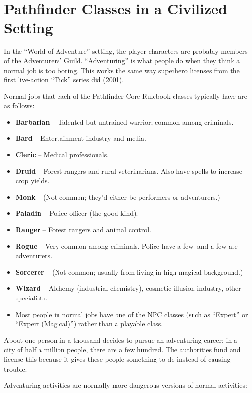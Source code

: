 %
%
\section{Pathfinder Classes in a Civilized Setting}
\label{sect-chargen-jobs}

In the ``World of Adventure'' setting, the player characters are probably
members of the Adventurers' Guild. ``Adventuring'' is what people do when
they think a normal job is too boring. This works the same way superhero
licenses from the first live-action ``Tick'' series did (2001).

Normal jobs that each of the Pathfinder Core Rulebook classes typically
have are as follows:

\begin{itemize}
%
\item \textbf{Barbarian} -- Talented but untrained warrior; common among
criminals.
%
\item \textbf{Bard} -- Entertainment industry and media.
%
\item \textbf{Cleric} -- Medical professionals.
%
\item \textbf{Druid} -- Forest rangers and rural veterinarians. Also have
spells to increase crop yields.
%
\item \textbf{Monk} -- (Not common; they'd either be performers or
adventurers.)
%
\item \textbf{Paladin} -- Police officer (the good kind).
%
\item \textbf{Ranger} -- Forest rangers and animal control.
%
\item \textbf{Rogue} -- Very common among criminals. Police have a few,
and a few are adventurers.
%
\item \textbf{Sorcerer} -- (Not common; usually from living in high magical
background.)
%
\item \textbf{Wizard} -- Alchemy (industrial chemistry), cosmetic illusion
industry, other specialists.
%
\item Most people in normal jobs have one of the NPC classes (such as
``Expert'' or ``Expert (Magical)'') rather than a playable class.
%
\end{itemize}

About one person in a thousand decides to pursue an adventuring career; in
a city of half a million people, there are a few hundred. The authorities
fund and license this because it gives these people something to do instead
of causing trouble.

Adventuring activities are normally more-dangerous versions of normal
activities:

